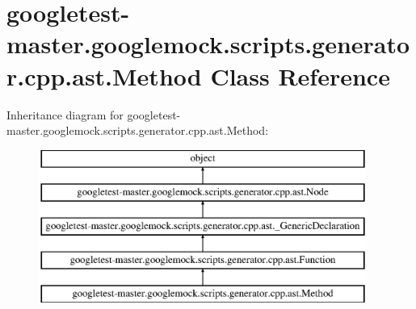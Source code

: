 \hypertarget{classgoogletest-master_1_1googlemock_1_1scripts_1_1generator_1_1cpp_1_1ast_1_1_method}{}\section{googletest-\/master.googlemock.\+scripts.\+generator.\+cpp.\+ast.\+Method Class Reference}
\label{classgoogletest-master_1_1googlemock_1_1scripts_1_1generator_1_1cpp_1_1ast_1_1_method}
Inheritance diagram for googletest-\/master.googlemock.\+scripts.\+generator.\+cpp.\+ast.\+Method\+:\begin{figure}[H]
\begin{center}
\leavevmode
\includegraphics[height=5.000000cm]{db/d53/classgoogletest-master_1_1googlemock_1_1scripts_1_1generator_1_1cpp_1_1ast_1_1_method}
\end{center}
\end{figure}
